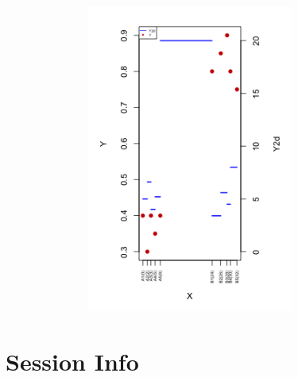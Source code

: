 \documentclass[12pt]{article}\usepackage[]{graphicx}\usepackage[usenames,dvipsnames]{color}
\begin{document}
\begin{figure}[htp]
\begin{center}
\includegraphics[width=4in,height=4in]{figure/topic_meta_diversity-1.png}
\end{center}
\end{figure}


\section{Session Info}
\end{document}
